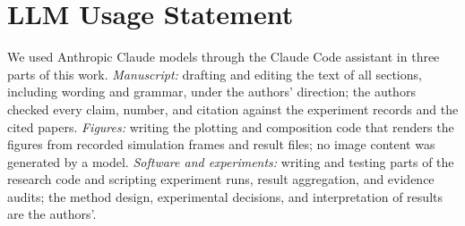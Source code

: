 \section*{LLM Usage Statement}
We used Anthropic Claude models through the Claude Code assistant in three parts of this work. \emph{Manuscript:} drafting and editing the text of all sections, including wording and grammar, under the authors' direction; the authors checked every claim, number, and citation against the experiment records and the cited papers. \emph{Figures:} writing the plotting and composition code that renders the figures from recorded simulation frames and result files; no image content was generated by a model. \emph{Software and experiments:} writing and testing parts of the research code and scripting experiment runs, result aggregation, and evidence audits; the method design, experimental decisions, and interpretation of results are the authors'. 

